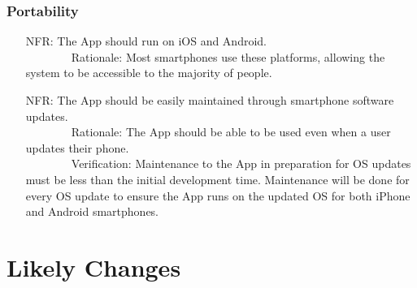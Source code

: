 \documentclass[12pt]{article}
\newcounter{nfrnum} %
\begin{document}
\subsubsection{Portability}
\begin{itemize}
\setlength{\itemindent}{.5in}
\item[NFR\refstepcounter{nfrnum}\thenfrnum\label{NFRPortability}:] The App should run on iOS and Android.
\\ \-\ \-\ \-\ \-\ \-\ \-\ \-\ \-\ Rationale: Most smartphones use these platforms, allowing the system to be accessible to the majority of people.
\item[NFR\refstepcounter{nfrnum}\thenfrnum\label{NFRUpdates}:] The App should be easily maintained through smartphone software updates.
\\ \-\ \-\ \-\ \-\ \-\ \-\ \-\ \-\ Rationale: The App should be able to be used even when a user updates their phone.
\\ \-\ \-\ \-\ \-\ \-\ \-\ \-\ \-\ Verification: Maintenance to the App in preparation for OS updates must be less than the initial development time. Maintenance will be done for every OS update to ensure the App runs on the updated OS for both iPhone and Android smartphones.


\end{itemize}




\section{Likely Changes}    
\end{document}
